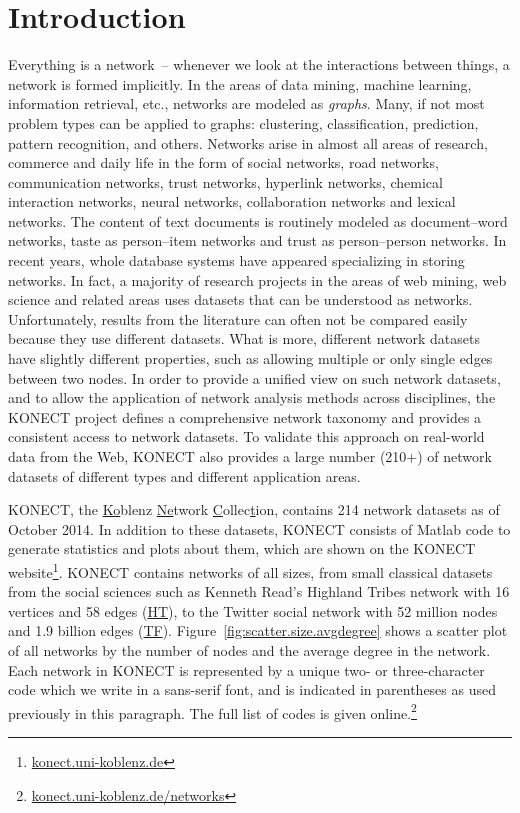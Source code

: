 \documentclass{article}
\begin{document}
\thispagestyle{empty}
\newpage

\section{Introduction}
Everything is a network~-- whenever we look at the interactions between
things, a network is formed implicitly.  In the areas of data mining,
machine learning, information retrieval, etc., networks are modeled
as \emph{graphs}.  Many, if not most problem types can be applied to
graphs: clustering, classification, prediction, pattern recognition, and
others.  Networks arise in almost all areas of research, commerce and
daily life in the form of social networks, road networks, communication
networks, trust networks, hyperlink networks, chemical interaction
networks, neural networks, collaboration networks and lexical networks.
The content of text documents is routinely modeled as document--word
networks, taste as person--item networks and trust as person--person
networks.  In recent years, whole database systems have appeared
specializing in storing networks.  In fact, a majority of research
projects in the areas of web mining, web science and related areas uses
datasets that can be understood as networks.  Unfortunately, results
from the literature can often not be compared easily because
they use different datasets. What is more, different network datasets
have slightly different properties, such as allowing multiple or only
single edges between two nodes.  In order to provide a unified view on
such network datasets, and to allow the application of network analysis
methods across disciplines, the KONECT project defines a comprehensive
network taxonomy and provides a consistent access to network datasets.
To validate this approach on real-world data from the Web, KONECT
also provides a large number (210+) of network datasets of different
types and different application areas. 

KONECT, the \underline{Ko}blenz \underline{Ne}twork \underline
Collec\underline tion, contains 214 network datasets as of October 2014.
In addition to these datasets, KONECT consists of Matlab code to
generate statistics and plots about them, which are shown on the
KONECT
website\footnote{\href{http://konect.uni-koblenz.de/}{konect.uni-koblenz.de}}.
KONECT contains networks of all sizes, from small classical datasets
from the social sciences such as Kenneth Read's Highland Tribes network
with 16 vertices and 58 edges
(\href{http://konect.uni-koblenz.de/networks/ucidata-gama}{\textsf{HT}}),
to the Twitter social network with 52 million nodes and 1.9 billion
edges
(\href{http://konect.uni-koblenz.de/networks/twitter_mpi}{\textsf{TF}}).
Figure~\ref{fig:scatter.size.avgdegree} shows a scatter plot of all
networks by the number of nodes and the average degree in the network.
Each network in KONECT is represented by a unique two- or
three-character code which we write in a \textsf{sans-serif font}, and
is indicated in parentheses as used previously in this paragraph. The
full list of codes is given
online.\footnote{\href{http://konect.uni-koblenz.de/networks}{konect.uni-koblenz.de/networks}}
\end{document}
